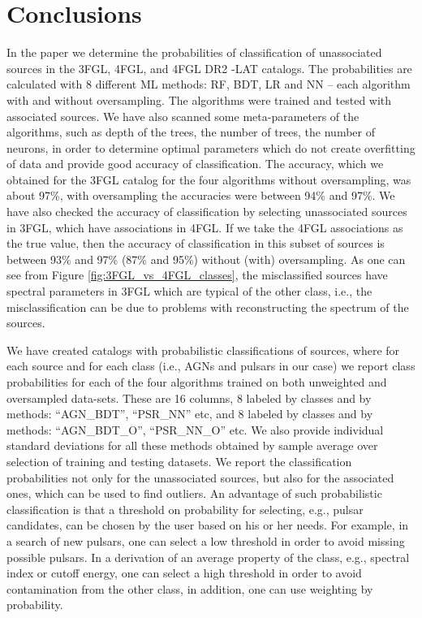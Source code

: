 \section{Conclusions}

In the paper we determine the probabilities of classification of unassociated sources in the 3FGL, 4FGL, and 4FGL DR2 \Fermi-LAT catalogs.
The probabilities are calculated with 8 different ML methods: RF, BDT, LR and NN -- each algorithm with and without oversampling.
The algorithms were trained and tested with associated sources.
We have also scanned some meta-parameters of the algorithms, such as depth of the trees, the number of trees, the number of neurons, in order to determine optimal parameters which do not create overfitting of data and provide good accuracy of classification.
The accuracy, which we obtained for the 3FGL catalog for the four algorithms without oversampling, was about 97\%, with oversampling the accuracies were between 94\% and 97\%.
We have also checked the accuracy of classification by selecting unassociated sources in 3FGL, which have associations in 4FGL.
If we take the 4FGL associations as the true value, then the accuracy of classification in this subset of sources is between 93\% and 97\% (87\% and 95\%) without (with) oversampling.
As one can see from Figure \ref{fig:3FGL_vs_4FGL_classes}, the misclassified sources have spectral parameters in 3FGL which are typical of the other class, i.e., the misclassification can be due to problems with reconstructing the spectrum of the sources.

We have created catalogs with probabilistic classifications of sources, where for each source and for each class (i.e., AGNs and pulsars in our case) we report class probabilities for each of the four algorithms trained on both unweighted and oversampled data-sets. These are 16 columns, 8 labeled by classes and by methods: ``AGN\_BDT'', ``PSR\_NN'' etc, and 8 labeled by classes and by methods: ``AGN\_BDT\_O'', ``PSR\_NN\_O'' etc. We also provide individual standard deviations for all these methods obtained by sample average over selection of training and testing datasets.
We report the classification probabilities not only for the unassociated sources, but also for the associated ones, which can be used to find outliers.
An advantage of such probabilistic classification is that a threshold on probability for selecting, e.g., pulsar candidates, can be chosen by the user based on his or her needs.
For example, in a search of new pulsars, one can select a low threshold in order to avoid missing possible pulsars.
In a derivation of an average property of the class, e.g., spectral index or cutoff energy, one can select a high threshold in order to avoid contamination from the other class, in addition, one can use weighting by probability.

